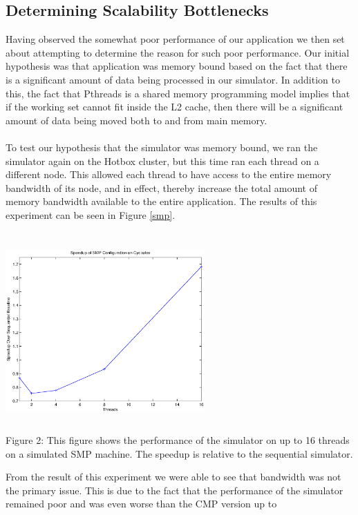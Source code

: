 \documentclass{article}
\begin{document}
\begin{multicols}{2}
\subsection{Determining Scalability Bottlenecks}
Having observed the somewhat poor performance of our application we then
set about attempting to determine the reason for such poor performance.
Our initial hypothesis was that application was memory bound based on the
fact that there is a significant amount of data being processed in our
simulator.  In addition to this, the fact that Pthreads is a shared memory
programming model implies that if the working set cannot fit inside the L2
cache, then there will be a significant amount of data being moved both to
and from main memory.\\
~\\
To test our hypothesis that the simulator was memory bound, we ran the
simulator again on the Hotbox cluster, but this time ran each thread on a
different node.  This allowed each thread to have access to the entire
memory bandwidth of its node, and in effect, thereby increase the total
amount of memory bandwidth available to the entire application.  The
results of this experiment can be seen in Figure \ref{smp}.\\
\begin{center}
\includegraphics[height=3in,width=3in]{smp.eps} \\
\small{Figure 2: This figure shows the performance of the simulator on
up to 16 threads on a simulated SMP machine.  The speedup is relative to
the sequential simulator.}
\end{center}
From the result of this experiment we were able to see that bandwidth was
not the primary issue.  This is due to the fact that the performance of
the simulator remained poor and was even worse than the CMP version up to

\end{multicols}
\end{document}

